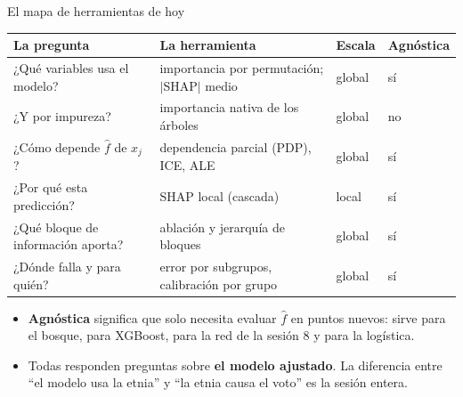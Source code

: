 \documentclass{beamer}
\newcommand{\1}{\mathbb{I}}
\begin{document}
\begin{frame}{El mapa de herramientas de hoy}
\small
\begin{center}
\scriptsize
\setlength{\tabcolsep}{3pt}
\renewcommand{\arraystretch}{1.15}
\begin{tabular}{p{3.4cm}p{3.9cm}ll}
\hline
La pregunta & La herramienta & Escala & Agnóstica \\
\hline
¿Qué variables usa el modelo? & importancia por permutación; $|$SHAP$|$ medio & global & sí \\
¿Y por impureza? & importancia nativa de los árboles & global & no \\
¿Cómo depende $\hat{f}$ de $x_j$? & dependencia parcial (PDP), ICE, ALE & global & sí \\
¿Por qué esta predicción? & SHAP local (cascada) & local & sí \\
¿Qué bloque de información aporta? & ablación y jerarquía de bloques & global & sí \\
¿Dónde falla y para quién? & error por subgrupos, calibración por grupo & global & sí \\
\hline
\end{tabular}
\end{center}
\pause
\vspace{0.1cm}
\begin{itemize}\itemsep3pt
  \item \textbf{Agnóstica} significa que solo necesita evaluar $\hat{f}$ en puntos nuevos: sirve para el bosque, para XGBoost, para la red de la sesión 8 y para la logística.
  \item Todas responden preguntas sobre \textbf{el modelo ajustado}. La diferencia entre ``el modelo usa la etnia'' y ``la etnia causa el voto'' es la sesión entera.
\end{itemize}
\end{frame}
\end{document}
